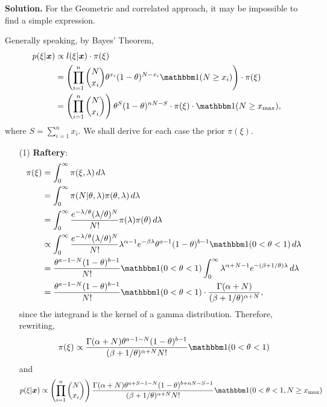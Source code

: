 \vspace{2ex}

    {\bf Solution.} For the Geometric and correlated approach, it may be impossible to find a simple
    expression. 

    Generally speaking, by Bayes' Theorem, 
    \begin{equation}
    \label{eq:bayes-theorem}
    \begin{split}
        p(\xi|\bx) &\propto l(\xi|\bx)\cdot\pi(\xi) \\
        &= \left(\prod_{i=1}^n \binom{N}{x_i}\theta^{x_i}(1 - \theta)^{N-x_i}\one(N \ge x_i)\right)\cdot \pi(\xi) \\
        &= \left(\prod_{i=1}^n \binom{N}{x_i}\right)\theta^{S}(1 - \theta)^{nN - S}\cdot \pi(\xi)\cdot\one(N\ge x_{\max}), 
    \end{split}
    \end{equation}
    where $S = \sum_{i=1}^n x_i$. We shall derive for each case the prior
    $\pi(\xi)$. 

    \begin{enumerate}
        \item[(1)] {\bf Raftery}: 
        \begin{equation*}
            \begin{split}
                \pi(\xi) &= \int_0^{\infty} \pi(\xi, \lambda) \, d\lambda \\
                &= \int_0^{\infty} \pi(N|\theta,\lambda)\pi(\theta,\lambda) \, d\lambda \\
                &= \int_0^{\infty} \frac{e^{-\lambda/\theta}(\lambda/\theta)^{N}}{N!}\pi(\lambda)\pi(\theta) \, d\lambda\\
                &\propto  \int_0^{\infty} \frac{e^{-\lambda/\theta}(\lambda/\theta)^{N}}{N!}\lambda^{\alpha - 1}e^{-\beta \lambda}\theta^{a-1}(1-\theta)^{b-1}\one(0<\theta<1) \, d\lambda\\
                &= \frac{\theta^{a-1-N}(1-\theta)^{b-1}}{N!}\one(0<\theta<1)\int_0^{\infty} \lambda^{\alpha + N - 1}e^{-(\beta + 1/\theta)\lambda} \, d\lambda \\
                &= \frac{\theta^{a-1-N}(1-\theta)^{b-1}}{N!}\one(0<\theta<1)\cdot \frac{\Gamma(\alpha+N)}{(\beta + 1/\theta)^{\alpha + N}},
            \end{split}
        \end{equation*}
        since the integrand is the kernel of a gamma distribution. Therefore,
        rewriting,
        \begin{equation}
            \label{eq:prior-raftery}
            \pi(\xi) \propto \frac{\Gamma(\alpha+N)\theta^{a-1-N}(1-\theta)^{b-1}}{(\beta + 1/\theta)^{\alpha + N}N!}\one(0<\theta<1)
        \end{equation}
        and
        \begin{equation}
            \label{eq:posterior-raftery}
            p(\xi|\bx) \propto \left(\prod_{i=1}^n \binom{N}{x_i}\right)\frac{\Gamma(\alpha+N)\theta^{a+S-1-N}(1-\theta)^{b+nN-S-1}}{(\beta + 1/\theta)^{\alpha + N}N!}\one(0<\theta<1, N\ge x_{\max})
        \end{equation} 
    \end{enumerate}


